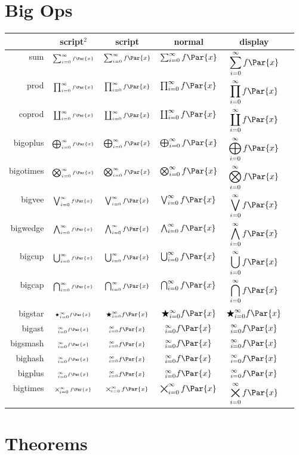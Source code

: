 \documentclass[11pt]{article}
\begin{document}
\section*{Big Ops}

\newcommand{\bigoptest}[1]{#1 & $\scriptscriptstyle{\call{#1}_{i=0}^\infty f\Par{x}}$ & $\scriptstyle{\call{#1}_{i=0}^\infty f\Par{x}}$ & $\call{#1}_{i=0}^\infty f\Par{x}$ & $\displaystyle{\call{#1}_{i=0}^\infty f\Par{x}}$\\}

\begin{center}
\begin{tabular}{r|ccccc}
    & script$^2$ & script & normal & display \\ \hline
    \bigoptest{sum}
    \bigoptest{prod}
    \bigoptest{coprod}
    \bigoptest{bigoplus}
    \bigoptest{bigotimes}
    \bigoptest{bigvee}
    \bigoptest{bigwedge}
    \bigoptest{bigcup}
    \bigoptest{bigcap}
    \bigoptest{bigstar}
    \bigoptest{bigast}
    \bigoptest{bigsmash}
    \bigoptest{bighash}
    \bigoptest{bigplus}
    \bigoptest{bigtimes}
\end{tabular}
\end{center}

\section*{Theorems}

\newcommand{\testthm}[3][]{
    \subsection{#2}
    \begin{S#3}[#1]
        For a magnetic field $\vB$, $\Dive\vB = 0$.
    \end{S#3}
    \begin{#3}
        The wavefunction $\Ps$ of a system is given by
        \[ i\hbar\pd{\Ps}{t} = \HH\Ps. \]
    \end{#3}
    \begin{#3*}
        \[ 1 + 2 + 3 + \cdots = -\frac{1}{12}. \]
    \end{#3*}
}
\newcommand{\testprf}[1]{
    \begin{#1}
        Let $V\subS U$.
    
        \FirstWay Let $V$ be open in $X$. Then, $U\cap V = V$ is open, and so
        $V$ is open in $U$.
        
        \OtherWay Let $V$ be open in $U$. Then, $V = U\cap W$ for some open
        $W$ in $X$. Because $U$ is open in $X$, $U\cap W$ is open. Hence $V$ is
        open in $X$.
    \end{#1}
}
\end{document}
